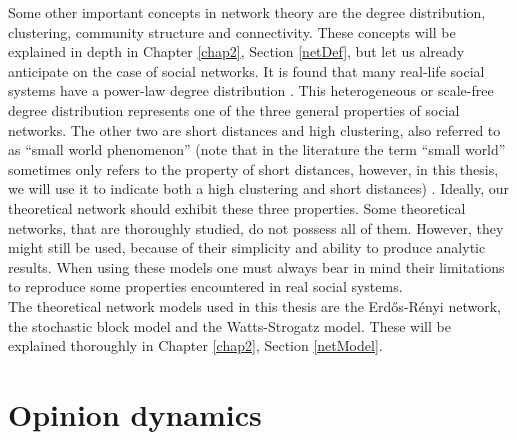 \documentclass[11 pt , letterpaper , twoside , openright]{book}
\begin{document}
\newline
Some other important concepts in network theory are the degree distribution, clustering, community structure and connectivity. These concepts will be explained in depth in Chapter \ref{chap2}, Section \ref{netDef}, but let us already anticipate on the case of social networks. It is found that many real-life social systems have a power-law degree distribution \cite{Muchnik2013}. This heterogeneous or scale-free degree distribution represents one of the three general properties of social networks. The other two are short distances and high clustering, also referred to as ``small world phenomenon'' (note that in the literature the term ``small world'' sometimes only refers to the property of short distances, however, in this thesis, we will use it to indicate both a high clustering and short distances) \cite{Muchnik2013}. Ideally, our theoretical network should exhibit these three properties. Some theoretical networks, that are thoroughly studied, do not possess all of them. However, they might still be used, because of their simplicity and ability to produce analytic results. When using these models one must always bear in mind their limitations to reproduce some properties encountered in real social systems. \\
\newline
The theoretical network models used in this thesis are the Erd\H{o}s-R\'{e}nyi network, the stochastic block model and the Watts-Strogatz model. These will be explained thoroughly in Chapter \ref{chap2}, Section \ref{netModel}. 

\section{Opinion dynamics}\label{Opinion}
\end{document}
